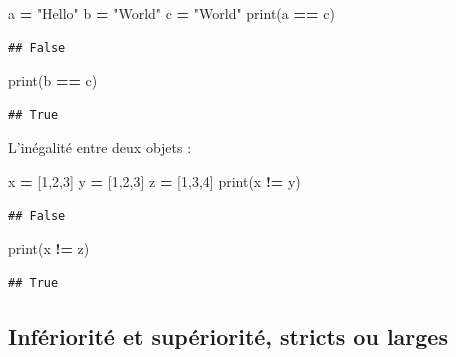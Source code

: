 \documentclass[12pt,]{book}
\newenvironment{Shaded}{\begin{snugshade}}{\end{snugshade}}
\newcommand{\DecValTok}[1]{\textcolor[rgb]{0.00,0.00,0.81}{#1}}
\newcommand{\StringTok}[1]{\textcolor[rgb]{0.31,0.60,0.02}{#1}}
\newcommand{\OperatorTok}[1]{\textcolor[rgb]{0.81,0.36,0.00}{\textbf{#1}}}
\newcommand{\BuiltInTok}[1]{#1}
\newcommand{\NormalTok}[1]{#1}
\numberwithin{equation}{section}
\numberwithin{countremarque}{section}
\begin{document}
\begin{Shaded}
\begin{Highlighting}[]
\NormalTok{a }\OperatorTok{=} \StringTok{"Hello"}
\NormalTok{b }\OperatorTok{=} \StringTok{"World"}
\NormalTok{c }\OperatorTok{=} \StringTok{"World"}
\BuiltInTok{print}\NormalTok{(a }\OperatorTok{==}\NormalTok{ c)}
\end{Highlighting}
\end{Shaded}

\begin{lstlisting}
## False
\end{lstlisting}

\begin{Shaded}
\begin{Highlighting}[]
\BuiltInTok{print}\NormalTok{(b }\OperatorTok{==}\NormalTok{ c)}
\end{Highlighting}
\end{Shaded}

\begin{lstlisting}
## True
\end{lstlisting}

L'inégalité entre deux objets :

\begin{Shaded}
\begin{Highlighting}[]
\NormalTok{x }\OperatorTok{=}\NormalTok{ [}\DecValTok{1}\NormalTok{,}\DecValTok{2}\NormalTok{,}\DecValTok{3}\NormalTok{]}
\NormalTok{y }\OperatorTok{=}\NormalTok{ [}\DecValTok{1}\NormalTok{,}\DecValTok{2}\NormalTok{,}\DecValTok{3}\NormalTok{]}
\NormalTok{z }\OperatorTok{=}\NormalTok{ [}\DecValTok{1}\NormalTok{,}\DecValTok{3}\NormalTok{,}\DecValTok{4}\NormalTok{]}
\BuiltInTok{print}\NormalTok{(x }\OperatorTok{!=}\NormalTok{ y)}
\end{Highlighting}
\end{Shaded}

\begin{lstlisting}
## False
\end{lstlisting}

\begin{Shaded}
\begin{Highlighting}[]
\BuiltInTok{print}\NormalTok{(x }\OperatorTok{!=}\NormalTok{ z)}
\end{Highlighting}
\end{Shaded}

\begin{lstlisting}
## True
\end{lstlisting}

\subsection{Infériorité et supériorité, stricts ou
larges}\label{inferiorite-et-superiorite-stricts-ou-larges}
\end{document}
